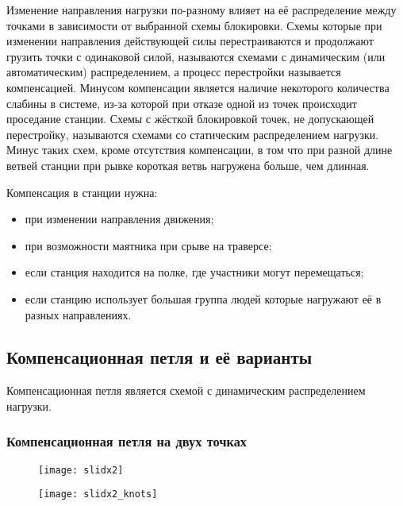 \documentclass[fleqn, 12pt]{extarticle}
\begin{document}
    Изменение направления нагрузки по-разному влияет на её распределение между точками в зависимости от выбранной схемы блокировки. Схемы которые при изменении направления
    действующей силы перестраиваются и продолжают грузить точки с одинаковой силой, называются схемами с динамическим (или автоматическим) распределением, а процесс перестройки 
    называется компенсацией. Минусом компенсации является наличие некоторого количества слабины в системе, из-за которой при отказе одной из точек происходит проседание станции. 
    Схемы с жёсткой блокировкой точек, не допускающей перестройку, называются схемами со статическим распределением нагрузки. Минус таких схем, кроме отсутствия компенсации,
    в том что при разной длине ветвей станции при рывке короткая ветвь нагружена больше, чем длинная.
    
    Компенсация в станции нужна:
    \begin{itemize}
        \item при изменении направления движения;
        \item при возможности маятника при срыве на траверсе;
        \item если станция находится на полке, где участники могут перемещаться;
        \item если станцию использует большая группа людей которые нагружают её в разных направлениях.
    \end{itemize}

\subsection{Компенсационная петля и её варианты}
    Компенсационная петля является схемой с динамическим распределением нагрузки.
    
    \subsubsection{Компенсационная петля на двух точках}
    \begin{figure}[h]
        \centering
        \begin{minipage}[t]{0.45\textwidth}
            \texttt{[image: slidx2]}
            \label{fig:slidx2}
        \end{minipage}\hspace{0.05\textwidth}
        \begin{minipage}[t]{0.45\textwidth}
            \texttt{[image: slidx2\_knots]}
            \label{fig:slidx2_knots}
        \end{minipage}
    \end{figure}
    
\end{document}
